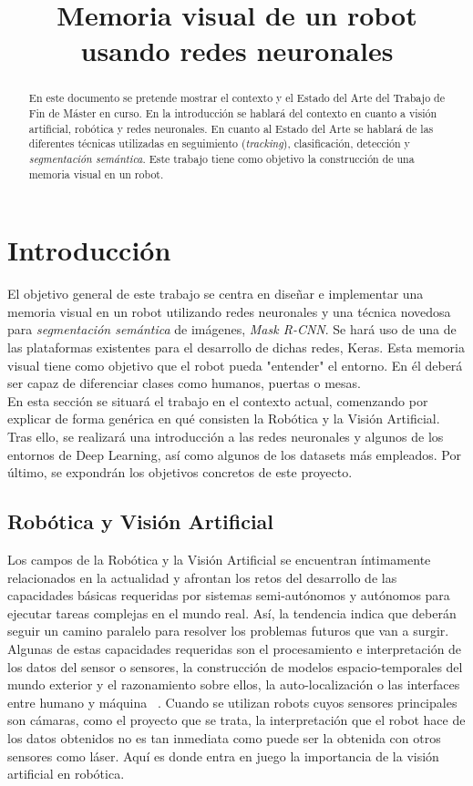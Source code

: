 \documentclass{bmvc2k}
\title{Memoria visual de un robot usando redes neuronales}
\begin{document}
\maketitle

\begin{abstract}
En este documento se pretende mostrar el contexto y el Estado del Arte del Trabajo de Fin de Máster en curso. En la introducción se hablará del contexto en cuanto a visión artificial, robótica y redes neuronales. En cuanto al Estado del Arte se hablará de las diferentes técnicas utilizadas en seguimiento (\textit{tracking}), clasificación, detección y \textit{segmentación semántica}. Este trabajo tiene como objetivo la construcción de una memoria visual en un robot.
\end{abstract}

\section{Introducción}
\label{sec:intro}
El objetivo general de este trabajo se centra en diseñar e implementar una memoria visual en un robot
utilizando redes neuronales y una técnica novedosa para \textit{segmentación semántica} de imágenes, \textit{Mask R-CNN}. Se hará uso de una de las plataformas existentes para el desarrollo de dichas redes, Keras. Esta memoria visual tiene como objetivo que el robot pueda "entender" el entorno. En él deberá ser capaz de diferenciar clases como humanos, puertas o mesas.\\
\noindent En esta sección se situará el trabajo en el contexto actual, comenzando por explicar de forma genérica en qué consisten la Robótica y la Visión Artificial. Tras ello, se realizará una introducción a las redes neuronales y algunos de los entornos de Deep Learning, así como algunos de los datasets más empleados. Por último, se expondrán los objetivos concretos de este proyecto.

\subsection{Robótica y Visión Artificial}
Los campos de la Robótica y la Visión Artificial se encuentran íntimamente relacionados en la actualidad y afrontan los retos del desarrollo de las capacidades básicas requeridas por sistemas semi-autónomos y autónomos para ejecutar tareas complejas en el mundo real. Así, la tendencia indica que deberán seguir un camino paralelo para resolver los problemas futuros que van a surgir. Algunas de estas capacidades requeridas son el procesamiento e interpretación de los datos del sensor o sensores, la construcción de modelos espacio-temporales del mundo exterior y el razonamiento sobre ellos, la auto-localización o las interfaces entre humano y máquina ~\cite{campos1998introduction}. Cuando se utilizan robots cuyos sensores principales son cámaras, como el proyecto que se trata, la interpretación que el robot hace de los datos obtenidos no es tan inmediata como puede ser la obtenida con otros sensores como láser. Aquí es donde entra en juego la importancia de la visión artificial en robótica.
\end{document}
